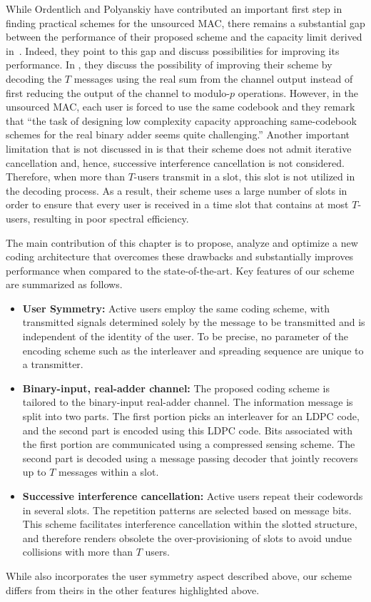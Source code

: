 While Ordentlich and Polyanskiy have contributed an important first step in finding practical schemes for the unsourced MAC, there remains a substantial gap between the performance of their proposed scheme and the capacity limit derived in~\cite{polyanskiy2017perspective}. Indeed, they point to this gap and discuss possibilities for improving its performance. In \cite[Section~III.A]{ordentlich2017low}, they discuss the possibility of improving their scheme by decoding the $T$ messages using the real sum from the channel output instead of first reducing the output of the channel to modulo-$p$ operations. However, in the unsourced MAC, each user is forced to use the same codebook and they remark that ``the task of designing low complexity capacity approaching same-codebook schemes for the real binary adder seems quite challenging.'' Another important limitation that is not discussed in \cite{ordentlich2017low} is that their scheme does not admit iterative cancellation and, hence, successive interference cancellation is not considered.
Therefore, when more than $T$-users transmit in a slot, this slot is not utilized in the decoding process. As a result, their scheme uses a large number of slots in order to ensure that every user is received in a time slot that contains at most $T$-users, resulting in poor spectral efficiency.

The main contribution of this chapter is to propose, analyze and optimize a new coding architecture that overcomes these drawbacks and substantially improves performance when compared to the state-of-the-art.
Key features of our scheme are summarized as follows.
\begin{itemize}
\item \textbf{User Symmetry:} Active users employ the same coding scheme, with transmitted signals determined solely by the message to be transmitted and is independent of the identity of the user. To be precise, no parameter of the encoding scheme such as the interleaver and spreading sequence are unique to a transmitter.
\item \textbf{Binary-input, real-adder channel:}
The proposed coding scheme is tailored to the binary-input real-adder channel.
The information message is split into two parts.
The first portion picks an interleaver for an LDPC code, and the second part is encoded using this LDPC code.
Bits associated with the first portion are communicated using a compressed sensing scheme.
The second part is decoded using a message passing decoder that jointly recovers up to $T$ messages within a slot.
\item \textbf{Successive interference cancellation:} Active users repeat their codewords in several slots. The repetition patterns are selected based on message bits. This scheme facilitates interference cancellation within the slotted structure, and therefore renders obsolete the over-provisioning of slots to avoid undue collisions with more than $T$ users.
\end{itemize}
While \cite{ordentlich2017low} also incorporates the user symmetry aspect described above, our scheme differs from theirs in the other features highlighted above.


